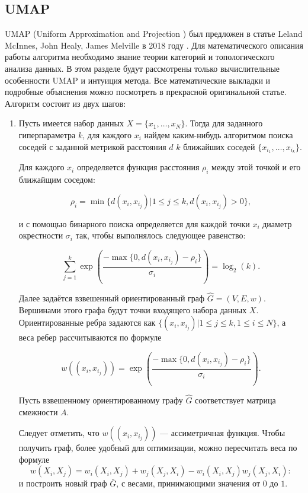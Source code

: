 \documentclass[10pt, a4paper]{extarticle}
\renewcommand{\leq}{\leqslant}
\newcommand{\lsum}{\sum\limits}
\begin{document}
\subsection{UMAP}
UMAP (Uniform Approximation and Projection ) был предложен в статье Leland McInnes, John Healy, James Melville в 2018 году \cite{mcinnes2018umap}.
Для математического описания работы алгоритма необходимо знание теории категорий и топологического анализа данных.
В этом разделе будут рассмотрены только вычислительные особенности UMAP и интуиция метода. 
Все математические выкладки и подробные объяснения можно посмотреть в прекрасной оригинальной статье.
Алгоритм состоит из двух шагов:
\begin{enumerate}
\item Пусть имеется набор данных $X = \{x_1, \ldots, x_N\}$. 
Тогда для заданного гиперпараметра $k$, для каждого $x_i$ найдем каким-нибудь алгоритмом поиска соседей с заданной метрикой расстояния $d$ $k$ ближайших соседей $\{ x_{i_1}, \ldots, x_{i_k}\}$.

Для каждого $x_i$ определяется функция расстояния $\rho_i$ между этой точкой и его ближайщим соседом:

\[
\rho_i = \min\{d(x_i, x_{i_j})| 1 \leq j \leq k, d(x_i, x_{i_j}) > 0\},
\]

и с помощью бинарного поиска определяется для каждой точки $x_i$  диаметр окрестности $\sigma_i$ так, чтобы выполнялось следующее равенство:

\[
\lsum_{j=1}^{k} \exp\left(\frac{-\max\{0, d(x_i, x_{i_j})-\rho_i\}}{\sigma_i}\right) = \log_2(k).
\]

Далее задаётся взвешенный ориентированный граф $\hat G = (V, E, w)$.
Вершинами этого графа будут точки входящего набора данных $X$.
Ориентированные ребра задаются как $\{(x_i, x_{i_j})| 1 \leq j \leq k, 1 \leq i \leq N\}$, а веса ребер рассчитываются по формуле

\[
w((x_i, x_{i_j})) = \exp\left(\frac{-\max\{0, d(x_i, x_{i_j})-\rho_i\}}{\sigma_i}\right).
\]

Пусть взвешенному ориентированному графу $\hat G$ соответствует матрица смежности $A$. 

Следует отметить, что $w((x_i, x_{i_j}))$ — ассиметричная функция. 
Чтобы получить граф, более удобный для оптимизации, можно пересчитать веса по формуле 
\[w\left(X_{i}, X_{j}\right)=w_{i}\left(X_{i}, X_{j}\right)+w_{j}\left(X_{j}, X_{i}\right)-w_{i}\left(X_{i}, X_{j}\right) w_{j}\left(X_{j}, X_{i}\right):
\]
и построить новый граф $\bar G$, с весами, принимающими значения от $0$ до $1$.


\end{enumerate}
\end{document}
